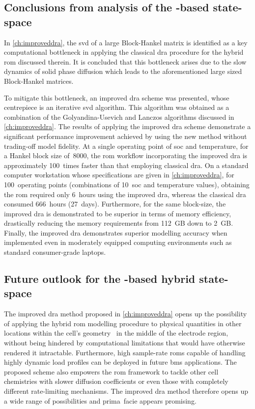 \subsection{Conclusions from analysis of the -based state-space }

In  \cref{ch:improveddra},  the \gls{svd}  of  a  large Block-Hankel  matrix  is
identified as a key computational bottleneck in applying the classical \gls{dra}
procedure for the hybrid \gls{rom} discussed  therein. It is concluded that this
bottleneck arises due to the slow  dynamics of solid phase diffusion which leads
to the aforementioned large sized Block-Hankel matrices.

To mitigate this  bottleneck, an improved \gls{dra} scheme  was presented, whose
centrepiece is an iterative \gls{svd}  algorithm. This algorithm was obtained as
a  combination of  the Golyandina-Usevich  and Lanczos  algorithms discussed  in
\cref{ch:improveddra}.  The results  of applying  the improved  \gls{dra} scheme
demonstrate  a significant  performance improvement  achieved by  using the  new
method  without trading-off  model  fidelity.  At a  single  operating point  of
\gls{soc}  and temperature,  for  a  Hankel block  size  of~8000, the  \gls{rom}
workflow incorporating the improved  \gls{dra} is approximately 100~times faster
than  that employing  classical \gls{dra}.  On a  standard computer  workstation
whose  specifications  are  given in  \cref{ch:improveddra},  for  100~operating
points  (combinations of  10~\gls{soc}  and temperature  values), obtaining  the
\gls{rom}  required  only 6~hours  using  the  improved \gls{dra},  whereas  the
classical  \gls{dra} consumed  666~hours  (27~days). Furthermore,  for the  same
block-size, the  improved \gls{dra} is demonstrated  to be superior in  terms of
memory efficiency, drastically reducing the memory requirements from 112~GB down
to  2~GB.  Finally,  the  improved  \gls{dra}  demonstrates  superior  modelling
accuracy  when implemented  even in  moderately equipped  computing environments
such as standard consumer-grade laptops.

\subsection{Future outlook for the -based hybrid state-space }

The improved  \gls{dra} method  proposed in  \cref{ch:improveddra} opens  up the
possibility of  applying the  hybrid \gls{rom}  modelling procedure  to physical
quantities in other locations within the  cell's geometry \eg~in the middle of
the electrode region,  without being hindered by  computational limitations that
would  have otherwise  rendered  it intractable.  Furthermore, high  sample-rate
\glspl{rom} capable  of handling  highly dynamic load  profiles can  be deployed
in  future  \gls{bms}  applications.  The  proposed  scheme  also  empowers  the
\gls{rom}  framework to  tackle  other cell  chemistries  with slower  diffusion
coefficients or  even those with completely  different rate-limiting mechanisms.
The improved \gls{dra}  method therefore opens up a wide  range of possibilities
and  prima~facie appears promising.

